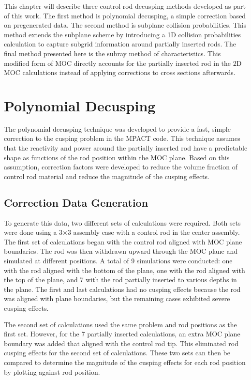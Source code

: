 This chapter will describe three control rod decusping methods developed as part of this work.  The first method is polynomial decusping, a simple correction based on pregenerated data.  The second method is subplane collision probabilities.  This method extends the subplane scheme by introducing a 1D collision probabilities calculation to capture subgrid information around partially inserted rods.  The final method presented here is the subray method of characteristics.  This modified form of MOC directly accounts for the partially inserted rod in the 2D MOC calculations instead of applying corrections to cross sections afterwards.

\section{Polynomial Decusping}

The polynomial decusping technique was developed to provide a fast, simple correction to the cusping problem in the MPACT code.  This technique assumes that the reactivity and power around the partially inserted rod have a predictable shape as functions of the rod position within the MOC plane.  Based on this assumption, correction factors were developed to reduce the volume fraction of control rod material and reduce the magnitude of the cusping effects.

\subsection{Correction Data Generation}

To generate this data, two different sets of calculations were required.  Both sets were done using a 3$\times$3 assembly case with a control rod in the center assembly.  The first set of calculations began with the control rod aligned with MOC plane boundaries.  The rod was then withdrawn upward through the MOC plane and simulated at different positions.  A total of 9 simulations were conducted: one with the rod aligned with the bottom of the plane, one with the rod aligned with the top of the plane, and 7 with the rod partially inserted to various depths in the plane.  The first and last calculations had no cusping effects because the rod was aligned with plane boundaries, but the remaining cases exhibited severe cusping effects.

The second set of calculations used the same problem and rod positions as the first set.  However, for the 7 partially inserted calculations, an extra MOC plane boundary was added that aligned with the control rod tip.  This eliminated rod cusping effects for the second set of calculations.  These two sets can then be compared to determine the magnitude of the cusping effects for each rod position by plotting \keff{} against rod position.

